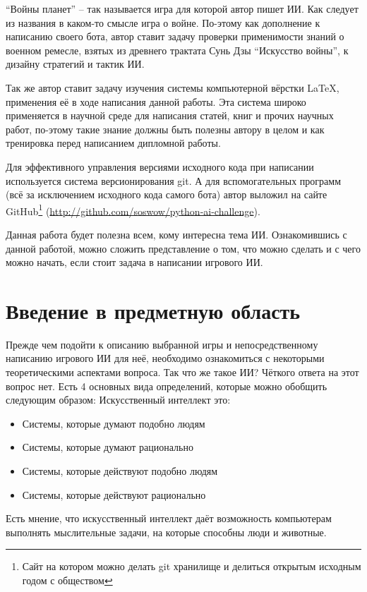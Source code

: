 \documentclass[12pt]{report}
\newenvironment{myItemize}{
	\begin{itemize}
  		\setlength{\itemsep}{1pt}
  		\setlength{\parskip}{0pt}
  		\setlength{\parsep}{0pt}
}{\end{itemize}}
\begin{document}
``Войны планет'' -- так называется игра для которой автор пишет ИИ. Как следует из названия в каком-то смысле игра о войне. По-этому как дополнение к написанию своего бота, автор ставит задачу проверки применимости знаний о военном ремесле, взятых из древнего трактата Сунь Дзы ``Искусство войны'', к дизайну стратегий и тактик ИИ.

Так же автор ставит задачу изучения системы компьютерной вёрстки \LaTeX, применения её в ходе написания данной работы. Эта система широко применяется в научной среде для написания статей, книг и прочих научных работ, по-этому такие знание должны быть полезны автору в целом и как тренировка перед написанием дипломной работы.

Для эффективного управления версиями исходного кода при написании используется система версионирования git. А для вспомогательных программ (всё за исключением исходного кода самого бота) автор выложил на сайте GitHub\footnote{Сайт на котором можно делать git хранилище и делиться открытым исходным годом с обществом} (\url{http://github.com/soswow/python-ai-challenge}).

Данная работа будет полезна всем, кому интересна тема ИИ. Ознакомившись с данной работой, можно сложить представление о том, что можно сделать и с чего можно начать, если стоит задача в написании игрового ИИ.

\chapter{Введение в предметную область}
\thispagestyle{fancy}
Прежде чем подойти к описанию выбранной игры и непосредственному написанию игрового ИИ для неё, необходимо ознакомиться с некоторыми теоретическими аспектами вопроса.
Так что же такое ИИ? Чёткого ответа на этот вопрос нет. Есть 4 основных вида определений, которые можно обобщить следующим образом: \citep{russell1995} Искусственный интеллект это:
\begin{myItemize}
\item Системы, которые думают подобно людям
\item Системы, которые думают рационально
\item Системы, которые действуют подобно людям
\item Системы, которые действуют рационально
\end{myItemize}
Есть мнение, что искусственный интеллект даёт возможность компьютерам выполнять мыслительные задачи, на которые способны люди и животные.\citep{millington2009} 
\end{document}
